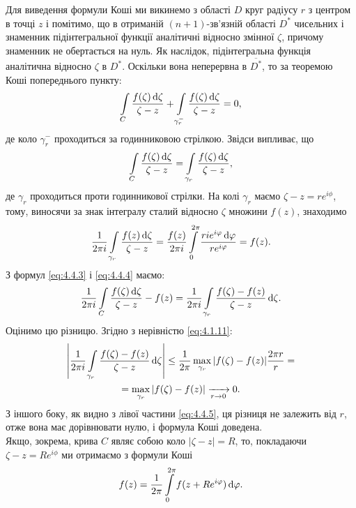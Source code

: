 Для виведення формули Коші ми викинемо з області $D$ круг радіусу $r$ з центром в точці $z$ і помітимо, що в отриманій $(n+1)$-зв'язній області $D^*$ чисельних і знаменник підінтегральної функції аналітичні відносно змінної $\zeta$, причому знаменник не обертається на нуль. Як наслідок, підінтегральна функція аналітична відносно $\zeta$ в $D^*$. Оскільки вона неперервна в $\overline{D^*}$, то за теоремою Коші попереднього пункту:
\begin{equation}
	\label{eq:4.4.2}
	\displaystyle\int\limits_C \dfrac{f(\zeta) \mathop{}\!\mathrm{d} \zeta}{\zeta - z} + \displaystyle\int\limits_{\gamma_r^-} \dfrac{f(\zeta) \mathop{}\!\mathrm{d} \zeta}{\zeta - z} = 0,
\end{equation}
де коло $\gamma_r^-$ проходиться за годинниковою стрілкою. Звідси випливає, що
\begin{equation}
	\label{eq:4.4.3}
	\displaystyle\int\limits_C \dfrac{f(\zeta) \mathop{}\!\mathrm{d} \zeta}{\zeta - z} = \displaystyle\int\limits_{\gamma_r} \dfrac{f(\zeta) \mathop{}\!\mathrm{d} \zeta}{\zeta - z},
\end{equation}
де $\gamma_r$ проходиться проти годинникової стрілки. На колі $\gamma_r$ маємо $\zeta - z = re^{i \phi}$, тому, виносячи за знак інтегралу сталий відносно $\zeta$ множини $f(z)$, знаходимо
\begin{equation}
	\label{eq:4.4.4}
	\dfrac{1}{2 \pi i} \displaystyle\int\limits_{\gamma_r} \dfrac{f(z) \mathop{}\!\mathrm{d} \zeta}{\zeta - z} = \dfrac{f(z)}{2 \pi i} \displaystyle\int\limits_0^{2 \pi} \dfrac{r i e^{i \varphi} \mathop{}\!\mathrm{d} \varphi}{r e^{i \varphi}} = f(z).
\end{equation}
З формул \eqref{eq:4.4.3} і \eqref{eq:4.4.4} маємо:
\begin{equation}
	\label{eq:4.4.5}
	\dfrac{1}{2 \pi i} \displaystyle\int\limits_C \dfrac{f(\zeta) \mathop{}\!\mathrm{d} \zeta}{\zeta - z} - f(z) = \dfrac{1}{2 \pi i} \displaystyle\int\limits_{\gamma_r} \dfrac{f(\zeta) - f(z)}{\zeta - z} \mathop{}\!\mathrm{d} \zeta.
\end{equation}
Оцінимо цю різницю. Згідно з нерівністю \eqref{eq:4.1.11}:
\begin{multline}
	\label{eq:4.4.6}
	\left| \dfrac{1}{2 \pi i} \displaystyle\int\limits_{\gamma_r} \dfrac{f(\zeta) - f(z)}{\zeta - z} \mathop{}\!\mathrm{d} \zeta \right| \le \dfrac{1}{2 \pi} \displaystyle\max\limits_{\gamma_r} |f(\zeta) - f(z)| \dfrac{2 \pi r}{r} = \\ = \displaystyle\max\limits_{\gamma_r} |f(\zeta) - f(z)| \xrightarrow[r \to 0]{} 0.
\end{multline}
З іншого боку, як видно з лівої частини \eqref{eq:4.4.5}, ця різниця не залежить від $r$, отже вона має дорівнювати нулю, і формула Коші доведена. \\

Якщо, зокрема, крива $C$ являє собою коло $|\zeta - z| = R$, то, покладаючи $\zeta - z = R e^{i \phi}$ ми отримаємо з формули Коші
\begin{equation}
	\label{eq:4.4.7}
	f(z) = \dfrac{1}{2 \pi} \displaystyle\int\limits_0^{2 \pi} f(z + R e^{i \varphi}) \mathop{}\!\mathrm{d} \varphi.
\end{equation}

